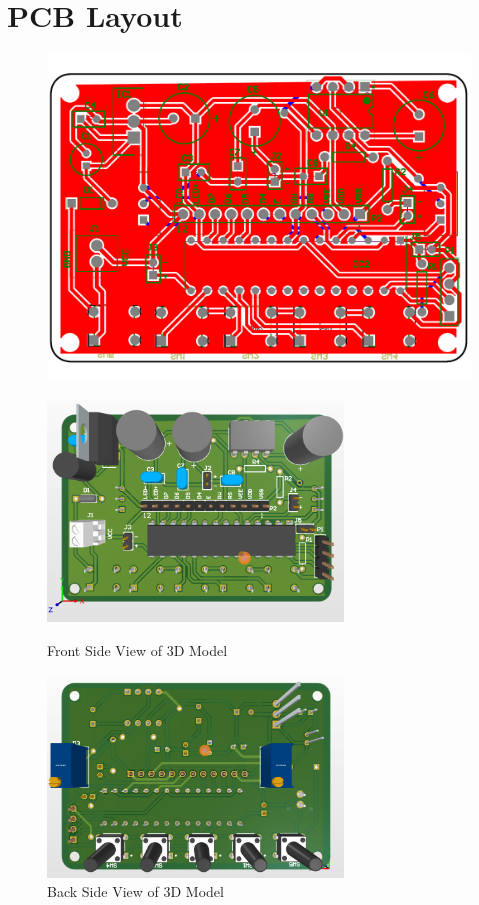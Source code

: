 \documentclass[12pt,twocolumn]{article}
\begin{document}
\newpage
\section{PCB Layout}
\begin{center}
    \begin{figure}[h]
        \includegraphics[width=\textwidth]{layout}
    \end{figure}
\end{center}

\begin{center}
    \begin{figure}[!h]
        \centering\includegraphics[width=0.70\textwidth]{front}
        \caption*{Front Side View of 3D Model}
        \centering\includegraphics[width=0.70\textwidth]{back}
        \caption*{Back Side View of 3D Model}
    \end{figure}
\end{center}
\end{document}

